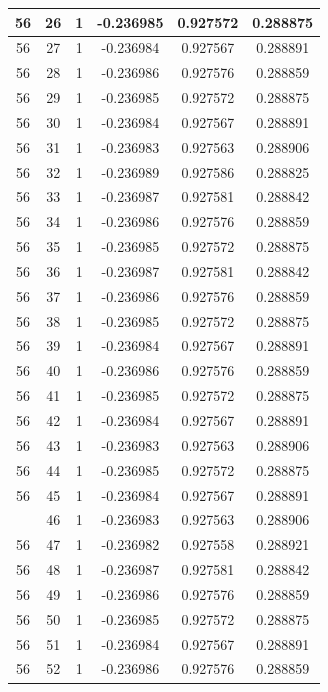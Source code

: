 \documentclass[12pt,a4paper]{article}
\numberwithin{equation}{section}
\numberwithin{figure}{section}
\numberwithin{table}{section}
\begin{document}
\begin{longtable}{|c|c|c|c|c|c|}
56 & 26 & 1 & -0.236985 & 0.927572 & 0.288875 \\ \hline
56 & 27 & 1 & -0.236984 & 0.927567 & 0.288891 \\ \hline
56 & 28 & 1 & -0.236986 & 0.927576 & 0.288859 \\ \hline
56 & 29 & 1 & -0.236985 & 0.927572 & 0.288875 \\ \hline
56 & 30 & 1 & -0.236984 & 0.927567 & 0.288891 \\ \hline
56 & 31 & 1 & -0.236983 & 0.927563 & 0.288906 \\ \hline
56 & 32 & 1 & -0.236989 & 0.927586 & 0.288825 \\ \hline
56 & 33 & 1 & -0.236987 & 0.927581 & 0.288842 \\ \hline
56 & 34 & 1 & -0.236986 & 0.927576 & 0.288859 \\ \hline
56 & 35 & 1 & -0.236985 & 0.927572 & 0.288875 \\ \hline
56 & 36 & 1 & -0.236987 & 0.927581 & 0.288842 \\ \hline
56 & 37 & 1 & -0.236986 & 0.927576 & 0.288859 \\ \hline
56 & 38 & 1 & -0.236985 & 0.927572 & 0.288875 \\ \hline
56 & 39 & 1 & -0.236984 & 0.927567 & 0.288891 \\ \hline
56 & 40 & 1 & -0.236986 & 0.927576 & 0.288859 \\ \hline
56 & 41 & 1 & -0.236985 & 0.927572 & 0.288875 \\ \hline
56 & 42 & 1 & -0.236984 & 0.927567 & 0.288891 \\ \hline
56 & 43 & 1 & -0.236983 & 0.927563 & 0.288906 \\ \hline
56 & 44 & 1 & -0.236985 & 0.927572 & 0.288875 \\ \hline
56 & 45 & 1 & -0.236984 & 0.927567 & 0.288891 \\ \hline
\pagebreak
56 & 46 & 1 & -0.236983 & 0.927563 & 0.288906 \\ \hline
56 & 47 & 1 & -0.236982 & 0.927558 & 0.288921 \\ \hline
56 & 48 & 1 & -0.236987 & 0.927581 & 0.288842 \\ \hline
56 & 49 & 1 & -0.236986 & 0.927576 & 0.288859 \\ \hline
56 & 50 & 1 & -0.236985 & 0.927572 & 0.288875 \\ \hline
56 & 51 & 1 & -0.236984 & 0.927567 & 0.288891 \\ \hline
56 & 52 & 1 & -0.236986 & 0.927576 & 0.288859 \\ \hline

\end{longtable}
\end{document}
